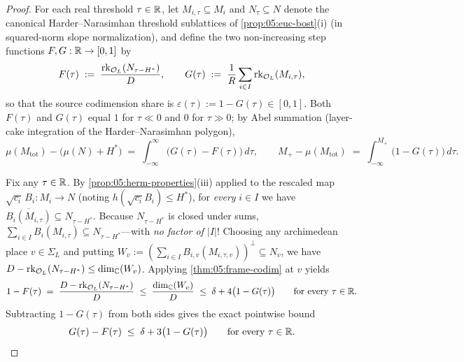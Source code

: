 \begin{proof}
For each real threshold $\tau \in \mathbb{R}$, let $M_{i,\tau} \subseteq M_i$ and $N_\tau \subseteq N$ denote the canonical Harder--Narasimhan threshold sublattices of \cref{prop:05:euc-bost}(i) (in squared-norm slope normalization), and define the two non-increasing step functions $F, G : \mathbb{R} \to [0, 1]$ by
\[
  F(\tau) \;:=\; \frac{\operatorname{rk}_{\mathcal{O}_L}(N_{\tau - H^*})}{D}, \qquad
  G(\tau) \;:=\; \frac{1}{R}\sum_{i \in I} \operatorname{rk}_{\mathcal{O}_L}(M_{i,\tau}),
\]
so that the source codimension share is $\varepsilon(\tau) := 1 - G(\tau) \in [0, 1]$. Both $F(\tau)$ and $G(\tau)$ equal $1$ for $\tau \ll 0$ and $0$ for $\tau \gg 0$; by Abel summation (layer-cake integration of the Harder--Narasimhan polygon),
\begin{equation}
\label{eq:05:layer-cake}
  \mu(M_{\mathrm{tot}}) - \bigl(\mu(N) + H^*\bigr) \;=\; \int_{-\infty}^{\infty} \bigl(G(\tau) - F(\tau)\bigr)\,d\tau,
  \qquad
  M_+ - \mu(M_{\mathrm{tot}}) \;=\; \int_{-\infty}^{M_+} \bigl(1 - G(\tau)\bigr)\,d\tau.
\end{equation}

Fix any $\tau \in \mathbb{R}$. By \cref{prop:05:herm-properties}(iii) applied to the rescaled map $\sqrt{c_i}\, B_i : M_i \to N$ (noting $h(\sqrt{c_i} B_i) \le H^*$), for \emph{every} $i \in I$ we have $\overline{B_i(M_{i,\tau})} \subseteq N_{\tau - H^*}$. Because $N_{\tau - H^*}$ is closed under sums, $\sum_{i \in I} B_i(M_{i,\tau}) \subseteq N_{\tau - H^*}$—with \emph{no factor of $|I|$}! Choosing any archimedean place $v \in \Sigma_L$ and putting $W_v := (\sum_{i \in I} B_{i,v}(M_{i,\tau,v}))^\perp \subseteq N_v$, we have $D - \operatorname{rk}_{\mathcal{O}_L}(N_{\tau - H^*}) \le \dim_{\mathbb{C}}(W_v)$. Applying \cref{thm:05:frame-codim} at $v$ yields
\[
  1 - F(\tau) \;=\; \frac{D - \operatorname{rk}_{\mathcal{O}_L}(N_{\tau - H^*})}{D}
  \;\le\; \frac{\dim_{\mathbb{C}}(W_v)}{D}
  \;\le\; \delta + 4\bigl(1 - G(\tau)\bigr) \qquad \text{for every } \tau \in \mathbb{R}.
\]
Subtracting $1 - G(\tau)$ from both sides gives the exact pointwise bound
\begin{equation}
\label{eq:05:GF-pointwise}
  G(\tau) - F(\tau) \;\le\; \delta + 3\bigl(1 - G(\tau)\bigr) \qquad \text{for every } \tau \in \mathbb{R}.
\end{equation}


\end{proof}
